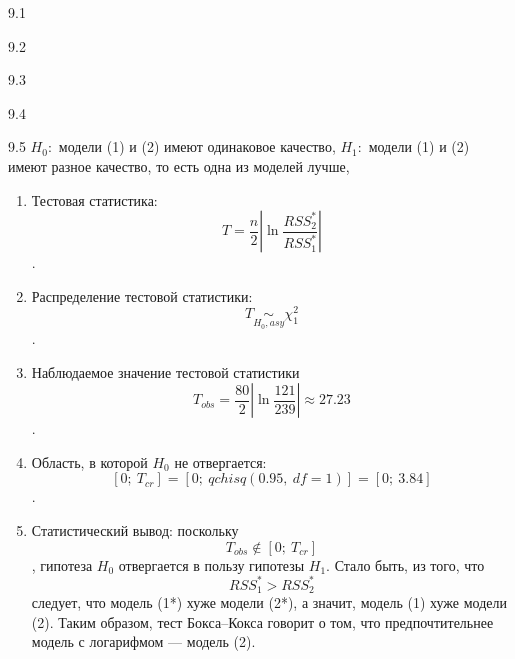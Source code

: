 \protect \hypertarget {soln:9.1}{}
\begin{solution}{{9.1}}
\end{solution}
\protect \hypertarget {soln:9.2}{}
\begin{solution}{{9.2}}
\end{solution}
\protect \hypertarget {soln:9.3}{}
\begin{solution}{{9.3}}
\end{solution}
\protect \hypertarget {soln:9.4}{}
\begin{solution}{{9.4}}
\end{solution}
\protect \hypertarget {soln:9.5}{}
\begin{solution}{{9.5}}
$H_0:$ модели (1) и (2) имеют одинаковое качество,
$H_1:$ модели (1) и (2) имеют разное качество, то есть одна из моделей лучше,
\begin{enumerate}
\item Тестовая статистика: \[T=\frac{n}{2}\left| \ln \frac{RSS_{2}^{*}}{RSS_{1}^{*}} \right|\].
\item Распределение тестовой статистики: \[T\underset{H_0, asy}{\sim} \chi^2_1 \].
\item Наблюдаемое значение тестовой статистики \[{{T}_{obs}}=\frac{80}{2}\left| \ln \frac{121}{239} \right|\approx \text{27.23}\].
\item Область, в которой $H_0$ не отвергается: \[[0;\ {{T}_{cr}}]=[0;\ qchisq(0.95,\ df=1)]=[0;\ \text{3.84}]\].
\item Статистический вывод: поскольку \[{{T}_{obs}}\notin [0;\ {{T}_{cr}}]\], гипотеза $H_0$ отвергается в пользу гипотезы $H_1$. Стало быть, из того, что \[RSS_{1}^{*}>RSS_{2}^{*}\] следует, что модель (1*) хуже модели (2*), а значит, модель (1) хуже модели (2). Таким образом, тест Бокса–Кокса говорит о том, что предпочтительнее модель с логарифмом — модель (2).
\end{enumerate}

\end{solution}
\protect \hypertarget {soln:9.6}{}
